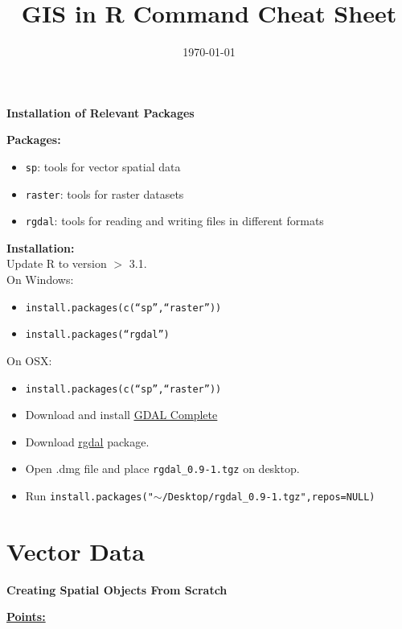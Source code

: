 \documentclass[10pt]{article}
\title{GIS in R Command Cheat Sheet}
\date{\today}
\begin{document}
 
\maketitle

	
\centerline{\textbf{Installation of Relevant Packages}}
\textbf{Packages:}
\begin{itemize}
	\item \texttt{sp}: tools for vector spatial data
	\item \texttt{raster}: tools for raster datasets
	\item \texttt{rgdal}: tools for reading and writing files in different formats
\end{itemize}
\textbf{Installation:}\\
Update R to version $>$ 3.1.\\
On Windows:
\begin{itemize}
	\item \texttt{install.packages(c(``sp'',``raster''))}
	\item \texttt{install.packages(``rgdal'')}
\end{itemize}
On OSX:
	\begin{itemize}
		\item \texttt{install.packages(c(``sp'',``raster''))}
		\item Download and install 	\href{http://www.kyngchaos.com/files/software/frameworks/GDAL_Complete-1.11.dmg}{\underline{GDAL Complete}}
		\item Download \href{http://www.kyngchaos.com/files/software/frameworks/rgdal-0.9.1-1.dmg}{\underline{rgdal}} package. 
		\item Open .dmg file and place \texttt{rgdal\_0.9-1.tgz} on desktop.
		\item Run \texttt{install.packages("$\sim$/Desktop/rgdal\_0.9-1.tgz",repos=NULL)}
	\end{itemize}



\section*{Vector Data}


\centerline{\textbf{Creating Spatial Objects From Scratch}} 
\underline{\textbf{Points:}}\\
\end{document}
